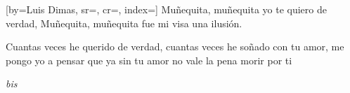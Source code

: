 [by={Luis Dimas},
                     sr={},
                     cr={},
                     index={}]
\beginverse
Muñequita, muñequita yo te quiero de verdad,
Muñequita, muñequita fue mi visa una ilusión.
\endverse

\beginverse
Cuantas veces he querido de verdad,
cuantas veces he soñado con tu amor,
me pongo yo a pensar que ya sin tu amor
no vale la pena morir por ti
\endverse

\vspace{0.4cm}
\emph{bis}

\endsong
